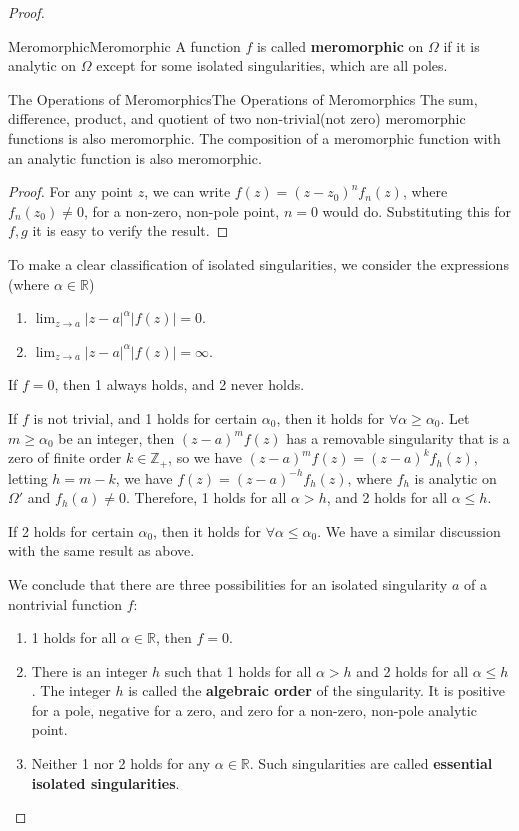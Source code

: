 \documentclass[../main.tex]{subfiles}
\begin{document}
\begin{proof}
\begin{definition}{Meromorphic}{Meromorphic}
	A function $f$ is called \textbf{meromorphic} on $\Omega$ if it is analytic on $\Omega$ except for some isolated singularities, which are all poles.
\end{definition}

\begin{proposition}{The Operations of Meromorphics}{The Operations of Meromorphics}
	The sum, difference, product, and quotient of two non-trivial(not zero) meromorphic functions is also meromorphic. The composition of a meromorphic function with an analytic function is also meromorphic.
\end{proposition}

\begin{proof}
	For any point $z$, we can write $f(z) = (z-z_0)^n f_n(z)$, where $f_n(z_0)\neq 0$, for a non-zero, non-pole point, $n=0$ would do. Substituting this for $f,g$ it is easy to verify the result.
\end{proof}

To make a clear classification of isolated singularities, we consider the expressions (where $\alpha\in \mathbb{R}$)
\begin{enumerate}
\item $\displaystyle \lim_{z \to a} \left|z-a\right|^{\alpha}\left|f(z)\right| = 0$.
\item $\displaystyle \lim_{z \to a} \left|z-a\right|^{\alpha}\left|f(z)\right| = \infty$.
\end{enumerate}

If $f=0$, then 1 always holds, and 2 never holds.

If $f$ is not trivial, and 1 holds for certain $\alpha_0$, then it holds for $\forall \alpha\geq \alpha_0$. Let $m\geq \alpha_0$ be an integer, then $(z-a)^mf(z)$ has a removable singularity that is a zero of finite order $k\in \mathbb{Z}_+$, so we have $(z-a)^mf(z) = (z-a)^kf_h(z)$, letting $h = m-k$, we have $f(z) = (z-a)^{-h} f_h(z)$, where $f_h$ is analytic on $\Omega'$ and $f_h(a)\neq 0$. Therefore, 1 holds for all $\alpha>h$, and 2 holds for all $\alpha\leq h$.

If 2 holds for certain $\alpha_0$, then it holds for $\forall \alpha\leq \alpha_0$. We have a similar discussion with the same result as above.

We conclude that there are three possibilities for an isolated singularity $a$ of a nontrivial function $f$:
\begin{enumerate}[label=(\roman*)]
	\item 1 holds for all $\alpha\in \mathbb{R}$, then $f=0$.
	\item There is an integer $h$ such that 1 holds for all $\alpha>h$ and 2 holds for all $\alpha\leq h$. The integer $h$ is called the \textbf{algebraic order} of the singularity. It is positive for a pole, negative for a zero, and zero for a non-zero, non-pole analytic point.
	\item Neither 1 nor 2 holds for any $\alpha\in \mathbb{R}$. Such singularities are called \textbf{essential isolated singularities}.
\end{enumerate}


\end{proof}
\end{document}
